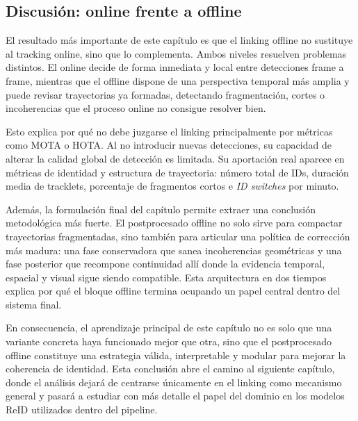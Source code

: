\documentclass[../MAIN.tex]{subfiles}
\begin{document}
	\subsection{Discusión: online frente a offline}
	
	El resultado más importante de este capítulo es que el linking offline no sustituye al tracking online, sino que lo complementa. Ambos niveles resuelven problemas distintos. El online decide de forma inmediata y local entre detecciones frame a frame, mientras que el offline dispone de una perspectiva temporal más amplia y puede revisar trayectorias ya formadas, detectando fragmentación, cortes o incoherencias que el proceso online no consigue resolver bien.
	
	Esto explica por qué no debe juzgarse el linking principalmente por métricas como MOTA o HOTA. Al no introducir nuevas detecciones, su capacidad de alterar la calidad global de detección es limitada. Su aportación real aparece en métricas de identidad y estructura de trayectoria: número total de IDs, duración media de tracklets, porcentaje de fragmentos cortos e \textit{ID switches} por minuto.
	
	Además, la formulación final del capítulo permite extraer una conclusión metodológica más fuerte. El postprocesado offline no solo sirve para compactar trayectorias fragmentadas, sino también para articular una política de corrección más madura: una fase conservadora que sanea incoherencias geométricas y una fase posterior que recompone continuidad allí donde la evidencia temporal, espacial y visual sigue siendo compatible. Esta arquitectura en dos tiempos explica por qué el bloque offline termina ocupando un papel central dentro del sistema final.
	
	En consecuencia, el aprendizaje principal de este capítulo no es solo que una variante concreta haya funcionado mejor que otra, sino que el postprocesado offline constituye una estrategia válida, interpretable y modular para mejorar la coherencia de identidad. Esta conclusión abre el camino al siguiente capítulo, donde el análisis dejará de centrarse únicamente en el linking como mecanismo general y pasará a estudiar con más detalle el papel del dominio en los modelos ReID utilizados dentro del pipeline.
	
	\newpage
	
\end{document}
